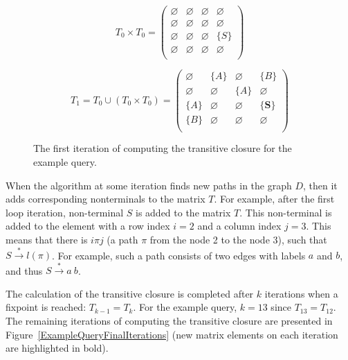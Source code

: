 \begin{figure}[h]
\[
T_0 \times T_0 = \begin{pmatrix}
	\varnothing & \varnothing & \varnothing & \varnothing \\
	\varnothing & \varnothing & \varnothing & \varnothing \\
	\varnothing & \varnothing & \varnothing & \{S\}       \\
	\varnothing & \varnothing & \varnothing & \varnothing \\
\end{pmatrix}
\]

\[
T_1 = T_0 \cup (T_0 \times T_0) = \begin{pmatrix}
	\varnothing & \{A\}       & \varnothing & \{B\}       \\
	\varnothing & \varnothing & \{A\}       & \varnothing \\
	\{A\}       & \varnothing & \varnothing & \{\pmb{S}\}       \\
	\{B\}       & \varnothing & \varnothing & \varnothing \\
\end{pmatrix}
\]
\caption{The first iteration of computing the transitive closure for the example query.}
\label{ExampleQueryFirstIteration}
\end{figure}

When the algorithm at some iteration finds new paths in the graph $D$, then it adds corresponding nonterminals to the matrix $T$. For example, after the first loop iteration, non-terminal $S$ is added to the matrix $T$. This non-terminal is added to the element with a row index $i = 2$ and a column index $j = 3$. This means that there is $i\pi j$ (a path $\pi$ from the node 2 to the node 3), such that $S \xrightarrow{*} l(\pi)$. For example, such a path consists of two edges with labels $a$ and $b$, and thus $S \xrightarrow{*} a \ b$.

The calculation of the transitive closure is completed after $k$ iterations when a fixpoint is reached: $T_{k-1} = T_k$. For the example query, $k = 13$ since $T_{13} = T_{12}$. The remaining iterations of computing the transitive closure are presented in Figure~\ref{ExampleQueryFinalIterations} (new matrix elements on each iteration are highlighted in bold).

